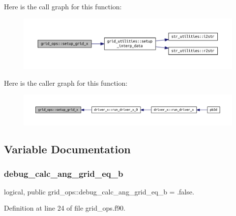 Here is the call graph for this function\+:
\nopagebreak
\begin{figure}[H]
\begin{center}
\leavevmode
\includegraphics[width=350pt]{namespacegrid__ops_a1047889ec84da6e56aae619570a16988_cgraph}
\end{center}
\end{figure}
Here is the caller graph for this function\+:
\nopagebreak
\begin{figure}[H]
\begin{center}
\leavevmode
\includegraphics[width=350pt]{namespacegrid__ops_a1047889ec84da6e56aae619570a16988_icgraph}
\end{center}
\end{figure}


\subsection{Variable Documentation}
\mbox{\label{namespacegrid__ops_ad043ab1b07b2d251bb7596b8c8d2f960}} 
\subsubsection{\texorpdfstring{debug\+\_\+calc\+\_\+ang\+\_\+grid\+\_\+eq\+\_\+b}{debug\_calc\_ang\_grid\_eq\_b}}
{\footnotesize\ttfamily logical, public grid\+\_\+ops\+::debug\+\_\+calc\+\_\+ang\+\_\+grid\+\_\+eq\+\_\+b = .false.}



Definition at line 24 of file grid\+\_\+ops.\+f90.


